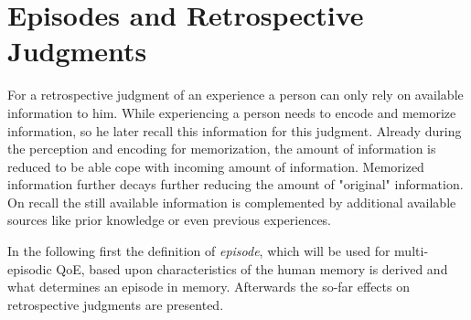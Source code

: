 \chapter{Episodes and Retrospective Judgments}\label{chap:03} %
%
%

For a retrospective judgment of an experience a person can only rely on available information to him.
While experiencing a person needs to encode and memorize information, so he later recall this information for this judgment.
Already during the perception and encoding for memorization, the amount of information is reduced to be able cope with incoming amount of information.
Memorized information further decays further reducing the amount of "original" information.
On recall the still available information is complemented by additional available sources like prior knowledge or even previous experiences.

In the following first the definition of \emph{episode}, which will be used for multi-episodic \ac{QoE}, based upon characteristics of the human memory is derived and what determines an episode in memory.
Afterwards the so-far effects on retrospective judgments are presented.




